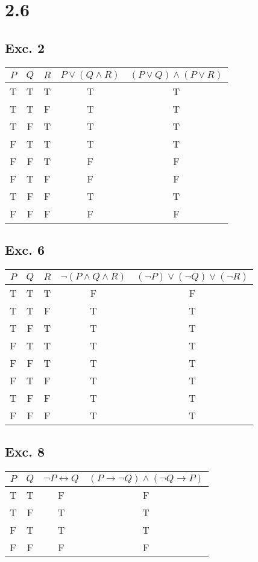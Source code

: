 \documentclass[12pt]{article}
\begin{document}
\section*{2.6}

\subsection*{Exc. 2}

\begin{tabular}{|c|c|c|c|c|}
    \hline
	\(P\) & \(Q\) & \(R\) & \(P \lor (Q \land R)\) & \((P \lor Q) \land (P \lor R)\)\\
    \hline
	T & T & T & T & T\\
	T & T & F & T & T\\
	T & F & T & T & T\\
	F & T & T & T & T\\
	F & F & T & F & F\\
	F & T & F & F & F\\
	T & F & F & T & T\\
	F & F & F & F & F\\
    \hline
\end{tabular}

\subsection*{Exc. 6}

\begin{tabular}{|c|c|c|c|c|}
    \hline
	\(P\) & \(Q\) & \(R\) & \(\neg(P \land Q \land R)\) & \((\neg P) \lor (\neg Q) \lor (\neg R)\)\\
    \hline
	T & T & T & F & F\\
	T & T & F & T & T\\
	T & F & T & T & T\\
	F & T & T & T & T\\
	F & F & T & T & T\\
	F & T & F & T & T\\
	T & F & F & T & T\\
	F & F & F & T & T\\
    \hline
\end{tabular}

\subsection*{Exc. 8}

\begin{tabular}{|c|c|c|c|}
    \hline
	\(P\) & \(Q\) & \( \neg P \leftrightarrow Q \) & \( (P \rightarrow \neg Q) \land (\neg Q \rightarrow P) \) \\
    \hline
	T & T & F & F \\
	T & F & T & T \\
	F & T & T & T \\
	F & F & F & F \\

    \hline
\end{tabular}
\end{document}
